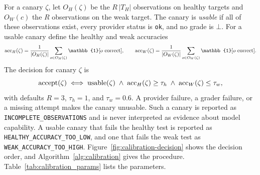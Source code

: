 For a canary $\zeta$, let $O_H(\zeta)$ be the $R\,|T_H|$ observations on healthy
targets and $O_W(c)$ the $R$ observations on the weak target. The canary is
\emph{usable} if all of these observations exist, every provider status is
\texttt{ok}, and no grade is $\bot$. For a usable canary define the healthy and
weak accuracies
\begin{equation}
  \label{eq:calibration_accuracy}
  \acc_H(\zeta) = \frac{1}{|O_H(\zeta)|}\sum_{o \in O_H(\zeta)} \mathbb{1}[o\ \text{correct}],
  \qquad
  \acc_W(\zeta) = \frac{1}{|O_W(\zeta)|}\sum_{o \in O_W(\zeta)} \mathbb{1}[o\ \text{correct}].
\end{equation}
The decision for canary $\zeta$ is
\begin{equation}
  \label{eq:calibration_decision}
  \text{accept}(\zeta) \iff \text{usable}(\zeta) \;\wedge\; \mathrm{acc}_H(\zeta) \geq \tau_h
    \;\wedge\; \mathrm{acc}_W(\zeta) \leq \tau_w,
\end{equation}
with defaults $R = 3$, $\tau_h = 1$, and $\tau_w = 0.6$. A provider failure, a
grader failure, or a missing attempt makes the canary unusable. Such a
canary is reported as \texttt{INCOMPLETE\_OBSERVATIONS} and is never
interpreted as evidence about model capability. A usable canary that fails
the healthy test is reported as \texttt{HEALTHY\_ACCURACY\_TOO\_LOW}, and one
that fails the weak test as \texttt{WEAK\_ACCURACY\_TOO\_HIGH}. Figure~\ref{fig:calibration-decision}
shows the decision order, and Algorithm~\ref{alg:calibration} gives the
procedure. Table~\ref{tab:calibration_params} lists the parameters.

